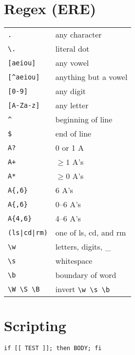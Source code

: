 \documentclass[a4paper, twocolumn]{article}
\renewcommand{\tt}{\texttt}
\begin{document}
\section{Regex (ERE)}
\begin{tabular}{ll}
    \verb|.|            & any character                             \\
    \verb|\.|           & literal dot                               \\
    \verb|[aeiou]|      & any vowel                                 \\
    \verb|[^aeiou]|     & anything but a vowel                      \\
    \verb|[0-9]|        & any digit                                 \\
    \verb|[A-Za-z]|     & any letter                                \\
    \verb|^|            & beginning of line                         \\
    \verb|$|            & end of line                               \\
    \verb|A?|           & 0 or 1 A                                  \\
    \verb|A+|           & $\ge 1$ A's                               \\
    \verb|A*|           & $\ge 0$ A's                               \\
    \verb|A{,6}|        & 6 A's                                     \\
    \verb|A{,6}|        & 0--6 A's                                  \\
    \verb|A{4,6}|       & 4--6 A's                                  \\
    \verb!(ls|cd|rm)!   & one of ls, cd, and rm                     \\
    \verb|\w|           & letters, digits, \_                       \\
    \verb|\s|           & whitespace                                \\
    \verb|\b|           & boundary of word                          \\
    \verb|\W \S \B|     & invert \verb|\w \s \b|
\end{tabular}


\section{Scripting}
\tt{if [[ TEST ]]; then BODY; fi}
\vspace{0.3cm}
\end{document}
